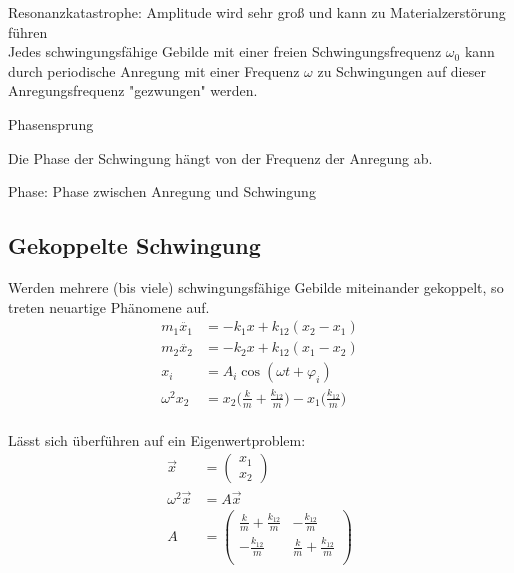 \documentclass[a4paper,12pt]{report}
\begin{document}
Resonanzkatastrophe: Amplitude wird sehr groß und kann zu Materialzerstörung führen \\

Jedes schwingungsfähige Gebilde mit einer freien Schwingungsfrequenz $\omega_0 $ kann durch periodische Anregung mit einer Frequenz $ \omega $ zu Schwingungen auf dieser Anregungsfrequenz "gezwungen" werden.

Phasensprung

Die Phase der Schwingung hängt von der Frequenz der Anregung ab.

Phase: Phase zwischen Anregung und Schwingung


\subsection{Gekoppelte Schwingung}

Werden mehrere (bis viele) schwingungsfähige Gebilde miteinander gekoppelt, so treten neuartige Phänomene auf. \\

\begin{align*}
m_1 \ddot{x_1} &=-k_1 x+k_{12} (x_2-x_1 ) \\	
m_2 \ddot{x_2} &=-k_2 x+k_{12} (x_1-x_2 ) \\
x_i &= A_i \cos(\omega t + \varphi_i) \\
\omega^2 x_2 &= x_2 \Biggl( \frac{k}{m} +\frac{k_{12}}{m} \Biggr) - x_1 \Biggl( \frac{k_{12}}{m} \Biggr) \\ 
\end{align*}

Lässt sich überführen auf ein Eigenwertproblem:\\

\begin{align*}
\vec{x} &= 
\begin{pmatrix} 
x_1 \\ 
x_2 
\end{pmatrix} \\
\omega^2 \vec{x} &= A \vec{x} \\
A &=
\begin{pmatrix}
 \frac{k}{m} +\frac{k_{12}}{m} & -\frac{k_{12}}{m} \\
-\frac{k_{12}}{m} & \frac{k}{m} +\frac{k_{12}}{m} \\
\end{pmatrix}
\end{align*}
\end{document}
